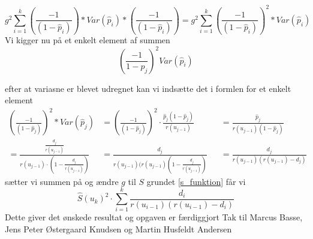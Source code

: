 \begin{equation}
    g^2\sum_{i=1}^k\left(\frac{-1}{(1-\hat{p}_i)}\right)*Var(\hat{p}_i)* \left(\frac{-1}{(1-\hat{p}_i)}\right)=g^2\sum_{i=1}^k\left(\frac{-1}{(1-\hat{p}_i)}\right)^2*Var(\hat{p}_i)
\end{equation}
Vi kigger nu på et enkelt element af summen
\begin{equation*}
    \left(\frac{-1}{ 1-\hat{p}_j }\right)^2 Var(\hat{p}_i)
\end{equation*}

efter at variasne er blevet udregnet kan vi indsætte det i formlen for et enkelt element 
\begin{align}
    \left(\frac{-1}{(1-\hat{p}_j)}\right)^2*Var(\hat{p}_j) &=  \left(\frac{-1}{(1-\hat{p}_j)}\right)^2\cdot \frac{\hat{p}_j(1-\hat{p}_j)}{r(u_{j-1})} &&= \frac{\hat{p}_j}{r(u_{j-1})(1-\hat{p}_j)} \\
    = \frac{\frac{d_j}{r(u_{j-1})}}{r(u_{j-1})\cdot \left(1-\frac{d_j}{r(u_{j-1})}\right)} &= \frac{d_j}{r(u_{j-1})(r(u_{j-1})(1-\frac{d_j}{r(u_{j-1})})}&&=\frac{d_j}{r(u_{j-1})(r(u_{j-1})-d_j)}
\end{align}
sætter vi summen på og ændre $g$ til $S$ grundet \eqref{s_funktion} får vi 
\begin{equation}
     \hat{S}(u_k)^2\cdot \sum^k_{i=1}\frac{d_i}{r(u_{i-1})(r(u_{i-1})-d_i)}
\end{equation}
Dette giver det ønskede resultat og opgaven er færdiggjort 
\newpage
Tak til Marcus Basse, Jens Peter Østergaard Knudsen og Martin Husfeldt Andersen







